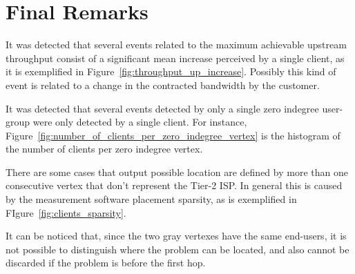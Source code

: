 \section{Final Remarks}

It was detected that several events related to the maximum achievable upstream
throughput consist of a significant mean increase perceived by a single client,
as it is exemplified in Figure~\ref{fig:throughput_up_increase}.
Possibly this kind of event is related to a change in the contracted bandwidth
by the customer.

It was detected that several events detected by only a single zero indegree
user-group were only detected by a single client. For instance,
Figure~\ref{fig:number_of_clients_per_zero_indegree_vertex} is the
histogram of the number of clients per zero indegree vertex.

There are some cases that output possible location are defined by more than one
consecutive vertex that don't represent the Tier-2 ISP. In general this is
caused by the measurement software placement sparsity, as is exemplified in
FIgure~\ref{fig:clients_sparsity}.

It can be noticed that, since the two gray vertexes have the same end-users, it
is not possible to distinguish where the problem can be located, and also
cannot be discarded if the problem is before the first hop.
